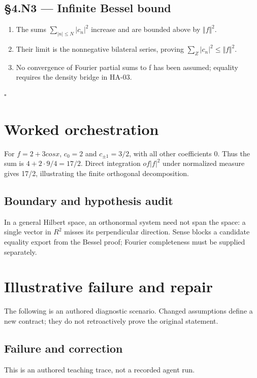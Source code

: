 \documentclass[preprint,12pt,aps,pra,showkeys,amsmath,amssymb,superscriptaddress,floatfix]{revtex4-2}
\theoremstyle{definition}
\theoremstyle{remark}
\begin{document}
\subsection{§4.N3 --- Infinite Bessel
bound}\label{n3-infinite-bessel-bound}

\begin{enumerate}
\def\labelenumi{\arabic{enumi}.}
\item
  The sums \(\sum _{|n|\le N}|c_n|^{2}\) increase and are bounded above
  by \(\Vert f\Vert ^{2}\).
\item
  Their limit is the nonnegative bilateral series, proving
  \(\sum _Z|c_n|^{2}\le \Vert f\Vert ^{2}\).
\item
  No convergence of Fourier partial sums to f has been assumed; equality
  requires the density bridge in HA-03.
\end{enumerate}

\hfill$\square$

\section{Worked orchestration}

For \(f=2+3cosx\), \(c_{0}=2\) and \(c_{\pm 1}=3/2\), with all other
coefficients 0. Thus the sum is \(4+2\cdot 9/4=17/2\). Direct
integration \(of|f|^{2}\) under normalized measure gives 17/2,
illustrating the finite orthogonal decomposition.

\subsection{Boundary and hypothesis audit}

In a general Hilbert space, an orthonormal system need not span the
space: a single vector in \(R^{2}\) misses its perpendicular direction.
Sense blocks a candidate equality export from the Bessel proof; Fourier
completeness must be supplied separately.

\section{Illustrative failure and repair}

The following is an authored diagnostic scenario. Changed assumptions
define a new contract; they do not retroactively prove the original
statement.

\subsection{Failure and correction}
This is an authored teaching trace, not a recorded agent run.
\end{document}
